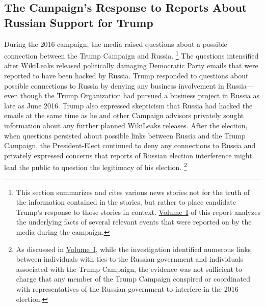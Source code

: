 \subsection{The Campaign's Response to Reports About Russian Support for Trump}
During the 2016 campaign, the media raised questions about a possible connection between the Trump Campaign and Russia.%
\footnote{This section summarizes and cites various news stories not for the truth of the information contained in the stories, but rather to place candidate Trump's response to those stories in context.
\hyperlink{chapter.1}{Volume~I} of this report analyzes the underlying facts of several relevant events that were reported on by the media during the campaign.}
The questions intensified after WikiLeaks released politically damaging Democratic Party emails that were reported to have been hacked by Russia.
Trump responded to questions about possible connections to Russia by denying any business involvement in Russia---even though the Trump Organization had pursued a business project in Russia as late as June 2016.
Trump also expressed skepticism that Russia had hacked the emails at the same time as he and other Campaign advisors privately sought information about any further planned WikiLeaks releases.
After the election, when questions persisted about possible links between Russia and the Trump Campaign, the President-Elect continued to deny any connections to Russia and privately expressed concerns that reports of Russian election interference might lead the public to question the legitimacy of his election.%
\footnote{As discussed in \hyperlink{chapter.1}{Volume~I}, while the investigation identified numerous links between individuals with ties to the Russian government and individuals associated with the Trump Campaign, the evidence was not sufficient to charge that any member of the Trump Campaign conspired or coordinated with representatives of the Russian government to interfere in the 2016 election.}

